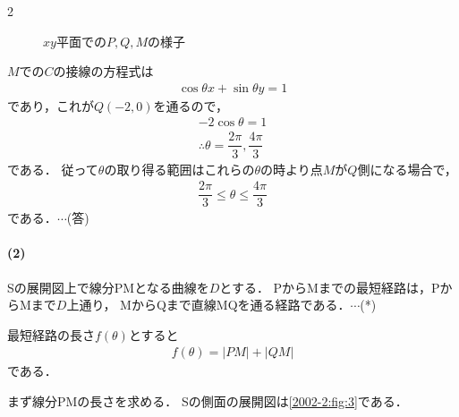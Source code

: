 \documentclass[../../main.tex]{subfiles}
\begin{document}
\begin{multicols}{2}
\begin{figure}[H]
    \caption{$xy$平面での$P,Q,M$の様子}
    \label{2002-2:fig:2}
  \end{figure}

  $M$での$C$の接線の方程式は
  \begin{align}
    \cos\theta x + \sin\theta y = 1
  \end{align}
  であり，これが$Q(-2,0)$を通るので，
  \begin{align}
    -2\cos\theta = 1 \\
    \therefore
    \theta = \dfrac{2\pi}{3}, \dfrac{4\pi}{3}
  \end{align}
  である．
  従って$\theta$の取り得る範囲はこれらの$\theta$の時より点$M$が$Q$側になる場合で，
  \begin{align}
    \dfrac{2\pi}{3} \le \theta \le \dfrac{4\pi}{3}
  \end{align}
  である．$\cdots$(答)

  \paragraph{(2)}
  Sの展開図上で線分PMとなる曲線を$D$とする．
  PからMまでの最短経路は，PからMまで$D$上通り，
  MからQまで直線MQを通る経路である．$\cdots$(*)

  最短経路の長さ$f(\theta)$とすると
  \begin{align}
    f(\theta) = |PM| + |QM|\label{eq:1}
  \end{align}
  である．

  まず線分PMの長さを求める．
  Sの側面の展開図は\cref{2002-2:fig:3}である．

  \begin{figure}[H]
    \centering
\end{figure}
\end{multicols}
\end{document}
